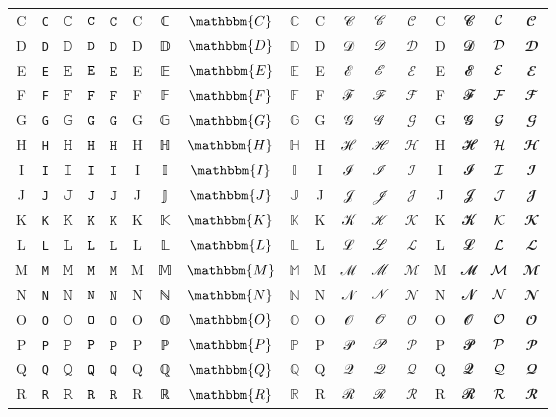 \documentclass[10pt]{standalone}
\newcommand{\TT}[1]{\ifmmode\mathtt{#1}\else\texttt{#1}\fi}
\newcommand{\BB}[1]{\ifmmode\mathbbm{#1}\else#1\fi}
\newcommand{\SCR}[1]{\ifmmode\mathscr{#1}\else#1\fi}
\newcommand{\CAL}[1]{\ifmmode\mathcal{#1}\else#1\fi}
\begin{document}
\begin{tabular}{c|cc|cc|cc|cc|cc|cc|cc|cc}
C & \TT{C} & 𝙲 & $\TT{C}$ & $𝙲$ & \BB{C} & ℂ & $\BB{C}$ & $ℂ$ & \SCR{C} & 𝒞 & $\SCR{C}$ & $𝒞$ & \CAL{C} & 𝓒 & $\CAL{C}$ & $𝓒$ \\
D & \TT{D} & 𝙳 & $\TT{D}$ & $𝙳$ & \BB{D} & 𝔻 & $\BB{D}$ & $𝔻$ & \SCR{D} & 𝒟 & $\SCR{D}$ & $𝒟$ & \CAL{D} & 𝓓 & $\CAL{D}$ & $𝓓$ \\
E & \TT{E} & 𝙴 & $\TT{E}$ & $𝙴$ & \BB{E} & 𝔼 & $\BB{E}$ & $𝔼$ & \SCR{E} & ℰ & $\SCR{E}$ & $ℰ$ & \CAL{E} & 𝓔 & $\CAL{E}$ & $𝓔$ \\
F & \TT{F} & 𝙵 & $\TT{F}$ & $𝙵$ & \BB{F} & 𝔽 & $\BB{F}$ & $𝔽$ & \SCR{F} & ℱ & $\SCR{F}$ & $ℱ$ & \CAL{F} & 𝓕 & $\CAL{F}$ & $𝓕$ \\
G & \TT{G} & 𝙶 & $\TT{G}$ & $𝙶$ & \BB{G} & 𝔾 & $\BB{G}$ & $𝔾$ & \SCR{G} & 𝒢 & $\SCR{G}$ & $𝒢$ & \CAL{G} & 𝓖 & $\CAL{G}$ & $𝓖$ \\
H & \TT{H} & 𝙷 & $\TT{H}$ & $𝙷$ & \BB{H} & ℍ & $\BB{H}$ & $ℍ$ & \SCR{H} & ℋ & $\SCR{H}$ & $ℋ$ & \CAL{H} & 𝓗 & $\CAL{H}$ & $𝓗$ \\
I & \TT{I} & 𝙸 & $\TT{I}$ & $𝙸$ & \BB{I} & 𝕀 & $\BB{I}$ & $𝕀$ & \SCR{I} & ℐ & $\SCR{I}$ & $ℐ$ & \CAL{I} & 𝓘 & $\CAL{I}$ & $𝓘$ \\
J & \TT{J} & 𝙹 & $\TT{J}$ & $𝙹$ & \BB{J} & 𝕁 & $\BB{J}$ & $𝕁$ & \SCR{J} & 𝒥 & $\SCR{J}$ & $𝒥$ & \CAL{J} & 𝓙 & $\CAL{J}$ & $𝓙$ \\
K & \TT{K} & 𝙺 & $\TT{K}$ & $𝙺$ & \BB{K} & 𝕂 & $\BB{K}$ & $𝕂$ & \SCR{K} & 𝒦 & $\SCR{K}$ & $𝒦$ & \CAL{K} & 𝓚 & $\CAL{K}$ & $𝓚$ \\
L & \TT{L} & 𝙻 & $\TT{L}$ & $𝙻$ & \BB{L} & 𝕃 & $\BB{L}$ & $𝕃$ & \SCR{L} & ℒ & $\SCR{L}$ & $ℒ$ & \CAL{L} & 𝓛 & $\CAL{L}$ & $𝓛$ \\
M & \TT{M} & 𝙼 & $\TT{M}$ & $𝙼$ & \BB{M} & 𝕄 & $\BB{M}$ & $𝕄$ & \SCR{M} & ℳ & $\SCR{M}$ & $ℳ$ & \CAL{M} & 𝓜 & $\CAL{M}$ & $𝓜$ \\
N & \TT{N} & 𝙽 & $\TT{N}$ & $𝙽$ & \BB{N} & ℕ & $\BB{N}$ & $ℕ$ & \SCR{N} & 𝒩 & $\SCR{N}$ & $𝒩$ & \CAL{N} & 𝓝 & $\CAL{N}$ & $𝓝$ \\
O & \TT{O} & 𝙾 & $\TT{O}$ & $𝙾$ & \BB{O} & 𝕆 & $\BB{O}$ & $𝕆$ & \SCR{O} & 𝒪 & $\SCR{O}$ & $𝒪$ & \CAL{O} & 𝓞 & $\CAL{O}$ & $𝓞$ \\
P & \TT{P} & 𝙿 & $\TT{P}$ & $𝙿$ & \BB{P} & ℙ & $\BB{P}$ & $ℙ$ & \SCR{P} & 𝒫 & $\SCR{P}$ & $𝒫$ & \CAL{P} & 𝓟 & $\CAL{P}$ & $𝓟$ \\
Q & \TT{Q} & 𝚀 & $\TT{Q}$ & $𝚀$ & \BB{Q} & ℚ & $\BB{Q}$ & $ℚ$ & \SCR{Q} & 𝒬 & $\SCR{Q}$ & $𝒬$ & \CAL{Q} & 𝓠 & $\CAL{Q}$ & $𝓠$ \\
R & \TT{R} & 𝚁 & $\TT{R}$ & $𝚁$ & \BB{R} & ℝ & $\BB{R}$ & $ℝ$ & \SCR{R} & ℛ & $\SCR{R}$ & $ℛ$ & \CAL{R} & 𝓡 & $\CAL{R}$ & $𝓡$ \\

\end{tabular}
\end{document}

